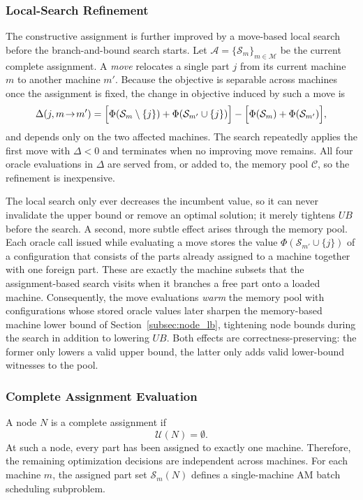 \documentclass[letterpaper, 10 pt, conference]{ieeeconf}  %
\begin{document}
\subsubsection{Local-Search Refinement}
\label{subsubsec:ls_refine}

The constructive assignment is further improved by a move-based local search
before the branch-and-bound search starts. Let
$\mathcal{A}=\{\mathcal{S}_m\}_{m\in\mathcal{M}}$ be the current complete
assignment. A \emph{move} relocates a single part $j$ from its current machine
$m$ to another machine $m'$. Because the objective is separable across machines
once the assignment is fixed, the change in objective induced by such a move is
\[
\Delta(j,m\!\to\!m')
=
\Bigl[\Phi(\mathcal{S}_m\setminus\{j\})+\Phi(\mathcal{S}_{m'}\cup\{j\})\Bigr]
-
\Bigl[\Phi(\mathcal{S}_m)+\Phi(\mathcal{S}_{m'})\Bigr],
\]
and depends only on the two affected machines. The search repeatedly applies the
first move with $\Delta<0$ and terminates when no improving move remains. All
four oracle evaluations in $\Delta$ are served from, or added to, the memory
pool $\mathcal{C}$, so the refinement is inexpensive.

The local search only ever decreases the incumbent value, so it can never
invalidate the upper bound or remove an optimal solution; it merely tightens
$UB$ before the search. A second, more subtle effect arises through the memory
pool. Each oracle call issued while evaluating a move stores the value
$\Phi(\mathcal{S}_{m'}\cup\{j\})$ of a configuration that consists of the parts
already assigned to a machine together with one foreign part. These are exactly
the machine subsets that the assignment-based search visits when it branches a
free part onto a loaded machine. Consequently, the move evaluations
\emph{warm} the memory pool with configurations whose stored oracle values
later sharpen the memory-based machine lower bound of
Section~\ref{subsec:node_lb}, tightening node bounds during the search in
addition to lowering $UB$. Both effects are correctness-preserving: the former
only lowers a valid upper bound, the latter only adds valid lower-bound
witnesses to the pool.

\subsubsection{Complete Assignment Evaluation}

A node $N$ is a complete assignment if
\[
\mathcal{U}(N)=\emptyset.
\]
At such a node, every part has been assigned to exactly one machine.
Therefore, the remaining optimization decisions are independent across
machines. For each machine $m$, the assigned part set
$\mathcal{S}_m(N)$ defines a single-machine AM batch scheduling subproblem.
\end{document}
